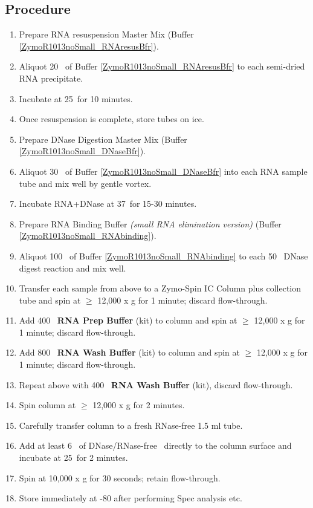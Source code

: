 \subsection{Procedure}
\begin{enumerate}
\item \chkBox Prepare RNA resuspension Master Mix (Buffer \ref{ZymoR1013noSmall_RNAresusBfr}).
\item \chkBox Aliquot 20 \mul\ of Buffer \ref{ZymoR1013noSmall_RNAresusBfr} to each semi-dried RNA precipitate.
\item \chkBox Incubate at 25\C\ for 10 minutes. 
\item \chkBox Once resuspension is complete, \alert{store tubes on ice}.
\item \chkBox Prepare DNase Digestion Master Mix (Buffer \ref{ZymoR1013noSmall_DNaseBfr}). 
\item \chkBox Aliquot 30 \mul\ of Buffer \ref{ZymoR1013noSmall_DNaseBfr} into each RNA sample tube and mix well by \alert{gentle} vortex.
\item \chkBox Incubate RNA+DNase at 37\C\ for 15-30 minutes.
\item \chkBox Prepare RNA Binding Buffer \textit{(small RNA elimination version)} (Buffer \ref{ZymoR1013noSmall_RNAbinding}).
\item \chkBox Aliquot 100 \mul\ of Buffer \ref{ZymoR1013noSmall_RNAbinding} to each 50 \mul\ DNase digest reaction and mix well.
\item \chkBox Transfer each sample from above to a Zymo-Spin IC Column plus collection tube and spin at $\ge$ 12,000 x g for 1 minute; discard flow-through.
\item \chkBox Add 400 \mul\ \textbf{RNA Prep Buffer} (kit) to column and spin at $\ge$ 12,000 x g for 1 minute; discard flow-through.
\item \chkBox Add 800 \mul\ \textbf{RNA Wash Buffer} (kit) to column and spin at $\ge$ 12,000 x g for 1 minute; discard flow-through.
\item \chkBox Repeat above with 400 \mul\ \textbf{RNA Wash Buffer} (kit), discard flow-through.
\item \chkBox Spin column at $\ge$ 12,000 x g for 2 minutes.
\item \chkBox Carefully transfer column to a fresh \alert{RNase-free} 1.5 ml tube.
\item \chkBox Add at least 6 \mul\ of \alert{DNase/RNase-free} \water\ directly to the column surface and incubate at 25\C\ for 2 minutes. 
\item \chkBox Spin at 10,000 x g for 30 seconds; retain flow-through.
\item Store immediately at \alert{-80\C{}} after performing Spec analysis etc.
\end{enumerate}




